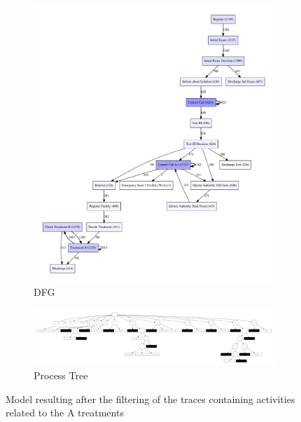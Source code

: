 \documentclass[12pt]{report}
\begin{document}
\begin{figure}[h]
    \centering
    \begin{subfigure}[b]{0.2\textwidth}
        \centering
	\includegraphics[width=\textwidth]{figures/q1_d_no_A.pdf}
        \caption{DFG}
        \label{fig:figures-q1_d_no_A-pdf}
    \end{subfigure}
    \hfill
    \begin{subfigure}[b]{0.7\textwidth}
        \centering
	\includegraphics[width=\textwidth]{figures/q1_d_tree_no_A.pdf}
        \caption{Process Tree}
        \label{fig:figures-q1_d_tree_no_A-pdf}
    \end{subfigure}
    \hfill
    \caption{Model resulting after the filtering of the traces containing activities related to the A treatments}
    \label{fig:dfg-pt-no-A}
\end{figure}
\end{document}
